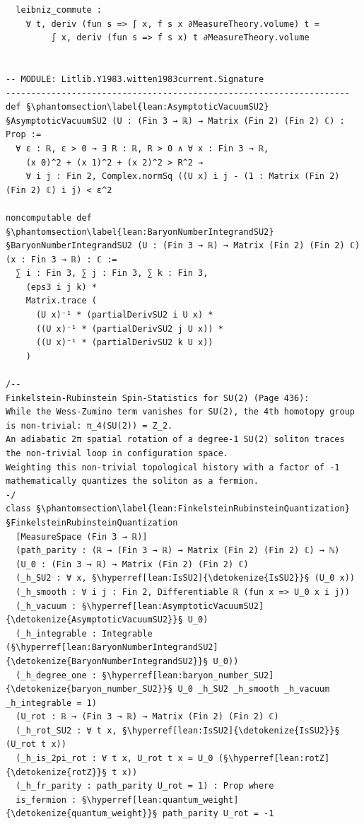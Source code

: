 \begin{verbatim}
  leibniz_commute :
    ∀ t, deriv (fun s => ∫ x, f s x ∂MeasureTheory.volume) t = 
         ∫ x, deriv (fun s => f s x) t ∂MeasureTheory.volume


-- MODULE: Litlib.Y1983.witten1983current.Signature
--------------------------------------------------------------------
def §\phantomsection\label{lean:AsymptoticVacuumSU2}§AsymptoticVacuumSU2 (U : (Fin 3 → ℝ) → Matrix (Fin 2) (Fin 2) ℂ) : Prop :=
  ∀ ε : ℝ, ε > 0 → ∃ R : ℝ, R > 0 ∧ ∀ x : Fin 3 → ℝ, 
    (x 0)^2 + (x 1)^2 + (x 2)^2 > R^2 → 
    ∀ i j : Fin 2, Complex.normSq ((U x) i j - (1 : Matrix (Fin 2) (Fin 2) ℂ) i j) < ε^2

noncomputable def §\phantomsection\label{lean:BaryonNumberIntegrandSU2}§BaryonNumberIntegrandSU2 (U : (Fin 3 → ℝ) → Matrix (Fin 2) (Fin 2) ℂ) (x : Fin 3 → ℝ) : ℂ :=
  ∑ i : Fin 3, ∑ j : Fin 3, ∑ k : Fin 3,
    (eps3 i j k) *
    Matrix.trace (
      (U x)⁻¹ * (partialDerivSU2 i U x) *
      ((U x)⁻¹ * (partialDerivSU2 j U x)) *
      ((U x)⁻¹ * (partialDerivSU2 k U x))
    )

/--
Finkelstein-Rubinstein Spin-Statistics for SU(2) (Page 436):
While the Wess-Zumino term vanishes for SU(2), the 4th homotopy group is non-trivial: π_4(SU(2)) = Z_2.
An adiabatic 2π spatial rotation of a degree-1 SU(2) soliton traces the non-trivial loop in configuration space.
Weighting this non-trivial topological history with a factor of -1 mathematically quantizes the soliton as a fermion.
-/
class §\phantomsection\label{lean:FinkelsteinRubinsteinQuantization}§FinkelsteinRubinsteinQuantization
  [MeasureSpace (Fin 3 → ℝ)]
  (path_parity : (ℝ → (Fin 3 → ℝ) → Matrix (Fin 2) (Fin 2) ℂ) → ℕ)
  (U_0 : (Fin 3 → ℝ) → Matrix (Fin 2) (Fin 2) ℂ)
  (_h_SU2 : ∀ x, §\hyperref[lean:IsSU2]{\detokenize{IsSU2}}§ (U_0 x))
  (_h_smooth : ∀ i j : Fin 2, Differentiable ℝ (fun x => U_0 x i j))
  (_h_vacuum : §\hyperref[lean:AsymptoticVacuumSU2]{\detokenize{AsymptoticVacuumSU2}}§ U_0)
  (_h_integrable : Integrable (§\hyperref[lean:BaryonNumberIntegrandSU2]{\detokenize{BaryonNumberIntegrandSU2}}§ U_0))
  (_h_degree_one : §\hyperref[lean:baryon_number_SU2]{\detokenize{baryon_number_SU2}}§ U_0 _h_SU2 _h_smooth _h_vacuum _h_integrable = 1)
  (U_rot : ℝ → (Fin 3 → ℝ) → Matrix (Fin 2) (Fin 2) ℂ)
  (_h_rot_SU2 : ∀ t x, §\hyperref[lean:IsSU2]{\detokenize{IsSU2}}§ (U_rot t x))
  (_h_is_2pi_rot : ∀ t x, U_rot t x = U_0 (§\hyperref[lean:rotZ]{\detokenize{rotZ}}§ t x))
  (_h_fr_parity : path_parity U_rot = 1) : Prop where
  is_fermion : §\hyperref[lean:quantum_weight]{\detokenize{quantum_weight}}§ path_parity U_rot = -1


\end{verbatim}
